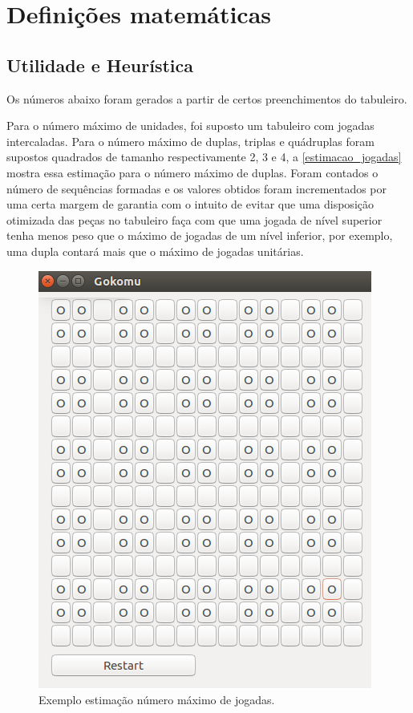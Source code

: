 \documentclass[
	article,			%
	11pt,				%
	oneside,			%
	a4paper,			%
	english,			%
	brazil,				%
	sumario=tradicional
	]{abntex2}
\begin{document}
\section{Definições matemáticas}

\subsection{Utilidade e Heurística}

Os números abaixo foram gerados a partir de certos preenchimentos do tabuleiro.

Para o número máximo de unidades, foi suposto um tabuleiro com jogadas intercaladas.
Para o número máximo de duplas, triplas e quádruplas foram supostos quadrados de tamanho
respectivamente 2, 3 e 4, a \autoref{estimacao_jogadas} mostra essa estimação para o número máximo de duplas. Foram contados o número de sequências formadas e os valores obtidos foram incrementados por uma certa margem de garantia com o intuito de evitar que uma disposição otimizada das peças no tabuleiro faça com que uma jogada de nível superior tenha menos peso que o máximo de jogadas de um nível inferior, por exemplo, uma dupla contará mais que o máximo de jogadas unitárias.

\begin{figure}[H]
    \caption{\label{estimacao_jogadas}Exemplo estimação número máximo de jogadas.}
        \begin{center}
            \includegraphics[scale=0.75]{nMaxDupla.png}
        \end{center}
\end{figure}
\end{document}
